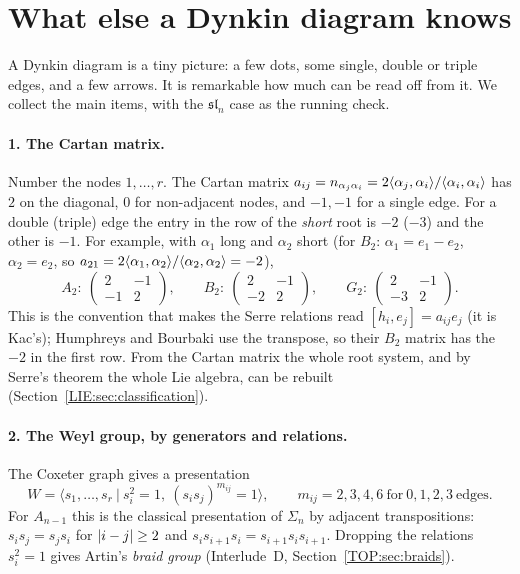 \section{What else a Dynkin diagram knows}
\label{LIE:sec:readoff}

A Dynkin diagram is a tiny picture: a few dots, some single, double or triple edges, and a few arrows.
It is remarkable how much can be read off from it. We collect the main items, with the
$\mathfrak{sl}_n$ case as the running check.

\paragraph{1. The Cartan matrix.} Number the nodes $1,\dots,r$. The Cartan matrix
$a_{ij}=n_{\alpha_j\alpha_i}=2\langle \alpha_j, \alpha_i\rangle/\langle \alpha_i, \alpha_i\rangle$ has $2$ on the diagonal,
$0$ for non-adjacent nodes, and $-1,-1$ for a single edge. For a double (triple) edge the entry in the
row of the \emph{short} root is $-2$ ($-3$) and the other is $-1$. For example, with $\alpha_1$ long and
$\alpha_2$ short (for $B_2$: $\alpha_1=e_1-e_2$, $\alpha_2=e_2$, so $a_{21}=2\langle \alpha_1, \alpha_2\rangle/\langle \alpha_2, \alpha_2\rangle=-2$),
\[
  A_2:\ \begin{pmatrix}2&-1\\-1&2\end{pmatrix},\qquad
  B_2:\ \begin{pmatrix}2&-1\\-2&2\end{pmatrix},\qquad
  G_2:\ \begin{pmatrix}2&-1\\-3&2\end{pmatrix}.
\]
This is the convention that makes the Serre relations read $[h_i,e_j]=a_{ij}e_j$ (it is Kac's);
Humphreys and Bourbaki use the transpose, so their $B_2$ matrix has the $-2$ in the first row. From
the Cartan matrix the whole root system, and by Serre's theorem the whole Lie algebra, can be
rebuilt (Section~\ref{LIE:sec:classification}).

\paragraph{2. The Weyl group, by generators and relations.} The Coxeter graph gives a presentation
\[
  W=\big\langle s_1,\dots,s_r\ \big|\ s_i^2=1,\ (s_is_j)^{m_{ij}}=1\big\rangle,\qquad
  m_{ij}=2,3,4,6\ \text{for}\ 0,1,2,3\ \text{edges}.
\]
For $A_{n-1}$ this is the classical presentation of $\Sigma_n$ by adjacent transpositions:
$s_is_j=s_js_i$ for $\left\lvert i-j \right\rvert\ge2$ and $s_is_{i+1}s_i=s_{i+1}s_is_{i+1}$. Dropping the relations
$s_i^2=1$ gives Artin's \emph{braid group} (Interlude~D, Section~\ref{TOP:sec:braids}).

